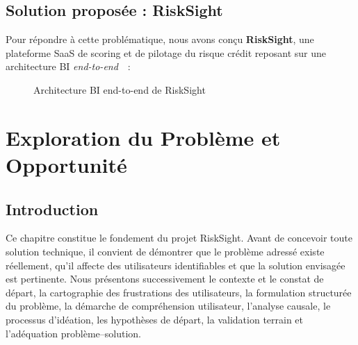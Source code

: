 \documentclass[12pt, a4paper]{report}
\begin{document}
\section*{Solution propos\'ee : RiskSight}

Pour r\'epondre \`a cette probl\'ematique, nous avons con\c cu \textbf{RiskSight},
une plateforme SaaS de scoring et de pilotage du risque cr\'edit reposant sur une
architecture BI \textit{end-to-end}~\cite{cdc_atlas}~:

\begin{figure}[H]
\centering
{}
\caption{Architecture BI end-to-end de RiskSight}
\label{fig:archi_intro}
\end{figure}



\chapter{Exploration du Problème et Opportunité}

\section{Introduction}

Ce chapitre constitue le fondement du projet RiskSight. Avant de concevoir toute
solution technique, il convient de démontrer que le problème adressé existe
réellement, qu'il affecte des utilisateurs identifiables et que la solution envisagée
est pertinente. Nous présentons successivement le contexte et le constat de départ,
la cartographie des frustrations des utilisateurs, la formulation structurée du
problème, la démarche de compréhension utilisateur, l'analyse causale, le processus
d'idéation, les hypothèses de départ, la validation terrain et l'adéquation
problème--solution.
\end{document}
